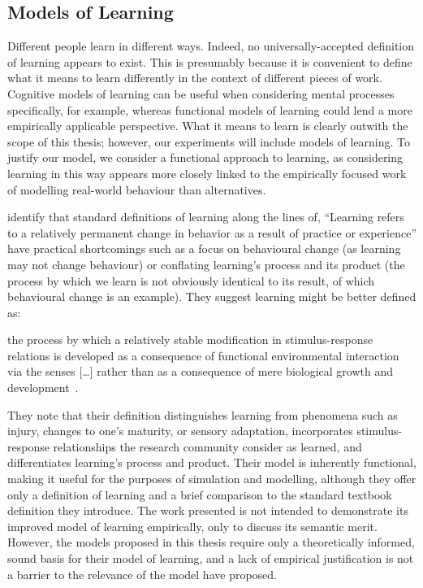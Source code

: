 \subsection{Models of Learning}\label{subsec:models_of_learning_discussed}
Different people learn in different ways. Indeed, no universally-accepted
definition of learning appears to exist. This is presumably because it is
convenient to define what it means to learn differently in the context of
different pieces of work. Cognitive models of learning can be useful when
considering mental processes specifically, for example, whereas functional
models of learning could lend a more empirically applicable perspective. What it
means to learn is clearly outwith the scope of this thesis; however, our
experiments will include models of learning. To justify our model, we consider a
functional approach to learning, as considering learning in this way appears
more closely linked to the empirically focused work of modelling real-world
behaviour than alternatives.

\citeauthor{lachman1997learning} identify\cite{lachman1997learning} that
standard definitions of learning along the lines of, ``Learning refers to a
relatively permanent change in behavior as a result of practice or experience''
have practical shortcomings such as a focus on behavioural change (as learning
may not change behaviour) or conflating learning's process and its product (the
process by which we learn is not obviously identical to its result, of which
behavioural change is an example). They suggest learning might be better defined
as:

\begin{displayquote}
[\ldots{}] the process by which a relatively stable modification in
stimulus-response relations is developed as a consequence of functional
environmental interaction via the senses [\ldots{}] rather than as a consequence
of mere biological growth and development~\cite{lachman1997learning}.
\end{displayquote}

They note that their definition distinguishes learning from phenomena such as
injury, changes to one's maturity, or sensory adaptation, incorporates
stimulus-response relationships the research community consider as learned, and
differentiates learning's process and product. Their model is inherently
functional, making it useful for the purposes of simulation and modelling,
although they offer only a definition of learning and a brief comparison to
the standard textbook definition they introduce. The work presented is not
intended to demonstrate its improved model of learning empirically, only to
discuss its semantic merit. However, the models proposed in this thesis require
only a theoretically informed, sound basis for their model of learning, and a
lack of empirical justification is not a barrier to the relevance of the model
\citeauthor{lachman1997learning} have proposed.

